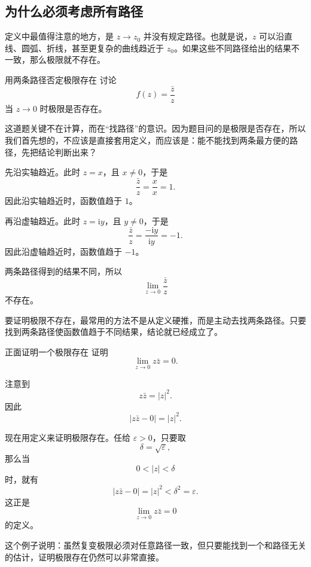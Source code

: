 \subsection{为什么必须考虑所有路径}

定义中最值得注意的地方，是 $z\to z_0$ 并没有规定路径。也就是说，$z$ 可以沿直线、圆弧、折线，甚至更复杂的曲线趋近于 $z_0$。如果这些不同路径给出的结果不一致，那么极限就不存在。

\begin{lizi}{用两条路径否定极限存在}{}
讨论
\[
    f(z)=\frac{\bar z}{z}
\]
当 $z\to 0$ 时极限是否存在。

\begin{jie}
这道题关键不在计算，而在``找路径''的意识。因为题目问的是极限是否存在，所以我们首先想的，不应该是直接套用定义，而应该是：能不能找到两条最方便的路径，先把结论判断出来？

先沿实轴趋近。此时 $z=x$，且 $x\neq 0$，于是
\[
    \frac{\bar z}{z}=\frac{x}{x}=1.
\]
因此沿实轴趋近时，函数值趋于 $1$。

再沿虚轴趋近。此时 $z=\mathrm{i}y$，且 $y\neq 0$，于是
\[
    \frac{\bar z}{z}=\frac{-\mathrm{i}y}{\mathrm{i}y}=-1.
\]
因此沿虚轴趋近时，函数值趋于 $-1$。

两条路径得到的结果不同，所以
\[
    \lim_{z\to 0}\frac{\bar z}{z}
\]
不存在。
\end{jie}
\end{lizi}

\begin{tishi}[这一类题目的基本判断策略]
要证明极限不存在，最常用的方法不是从定义硬推，而是主动去找两条路径。只要找到两条路径使函数值趋于不同结果，结论就已经成立了。
\end{tishi}

\begin{lizi}{正面证明一个极限存在}{}
证明
\[
    \lim_{z\to 0} z\bar z=0.
\]

\begin{jie}
注意到
\[
    z\bar z=|z|^2.
\]
因此
\[
    |z\bar z-0|=|z|^2.
\]

现在用定义来证明极限存在。任给 $\varepsilon>0$，只要取
\[
    \delta=\sqrt{\varepsilon},
\]
那么当
\[
    0<|z|<\delta
\]
时，就有
\[
    |z\bar z-0|=|z|^2<\delta^2=\varepsilon.
\]
这正是
\[
    \lim_{z\to 0} z\bar z=0
\]
的定义。

这个例子说明：虽然复变极限必须对任意路径一致，但只要能找到一个和路径无关的估计，证明极限存在仍然可以非常直接。
\end{jie}
\end{lizi}

